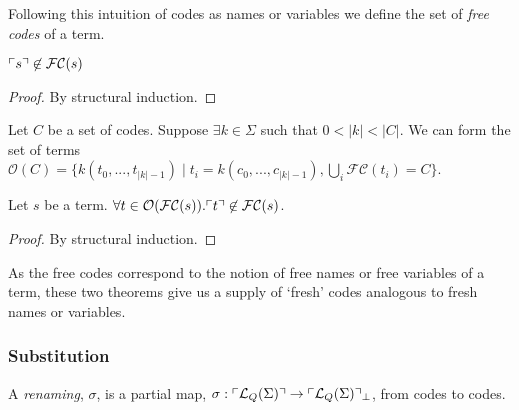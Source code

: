 Following this intuition of codes as names or variables we define the
set of \emph{free codes} of a term.

\begin{definition}
\end{definition}

\begin{theorem}
  $\ulcorner s \urcorner \not\in \mathcal{FC}(s)$
\end{theorem}
\begin{proof}
  By structural induction.
\end{proof}

\begin{definition}
  Let $C$ be a set of codes. Suppose $\exists k \in \Sigma$ such that
  $0 < |k| < |C|$. We can form the set of terms $\mathcal{O}(C) = \{
  k(t_0,...,t_{|k|-1}) \; | \; t_i = k(c_0,...,c_{|k|-1}), \bigcup_i
  \mathcal{FC}(t_i) = C\}$.
\end{definition}

\begin{theorem}
  Let $s$ be a term. $\forall t \in \mathcal{O}(\mathcal{FC}(s)). \ulcorner t \urcorner \not\in \mathcal{FC}(s)$.
\end{theorem}
\begin{proof}
  By structural induction.
\end{proof}

\begin{remark}
  As the free codes correspond to the notion of free names or free
  variables of a term, these two theorems give us a supply of `fresh'
  codes analogous to fresh names or variables.
\end{remark}

\subsubsection{Substitution}

\begin{definition}
  A \emph{renaming}, $\sigma$, is a partial map, $\sigma :
  \ulcorner \mathcal{L}_{Q}(\Sigma) \urcorner \to
  \ulcorner \mathcal{L}_{Q}(\Sigma) \urcorner_{\bot}$, from codes to codes.
\end{definition}

